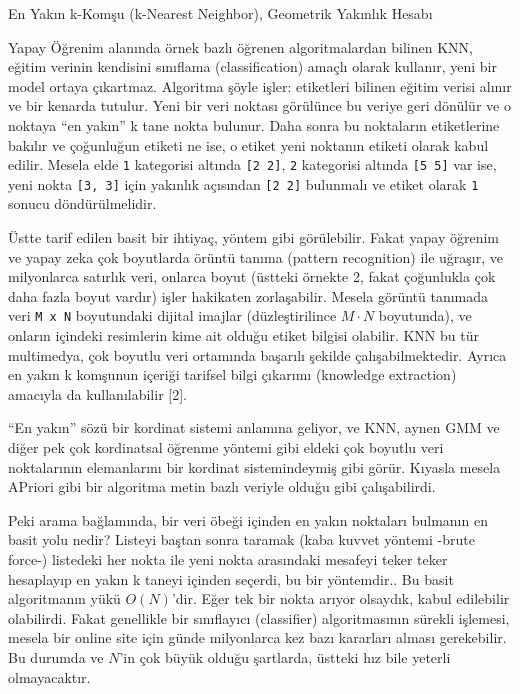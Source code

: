 \documentclass[12pt,fleqn]{article}\usepackage{../../common}
\begin{document}
En Yakın k-Komşu (k-Nearest Neighbor), Geometrik Yakınlık Hesabı

Yapay Öğrenim alanında örnek bazlı öğrenen algoritmalardan bilinen KNN, eğitim
verinin kendisini sınıflama (classification) amaçlı olarak kullanır, yeni bir
model ortaya çıkartmaz. Algoritma şöyle işler: etiketleri bilinen eğitim verisi
alınır ve bir kenarda tutulur. Yeni bir veri noktası görülünce bu veriye geri
dönülür ve o noktaya ``en yakın'' k tane nokta bulunur. Daha sonra bu noktaların
etiketlerine bakılır ve çoğunluğun etiketi ne ise, o etiket yeni noktanın
etiketi olarak kabul edilir. Mesela elde \verb!1! kategorisi altında
\verb![2 2]!, \verb!2! kategorisi altında \verb![5 5]!  var ise, yeni nokta
\verb![3, 3]! için yakınlık açısından \verb![2 2]! bulunmalı ve etiket olarak
\verb!1!  sonucu döndürülmelidir.

Üstte tarif edilen basit bir ihtiyaç, yöntem gibi görülebilir. Fakat yapay
öğrenim ve yapay zeka çok boyutlarda örüntü tanıma (pattern recognition)
ile uğraşır, ve milyonlarca satırlık veri, onlarca boyut (üstteki örnekte
2, fakat çoğunlukla çok daha fazla boyut vardır) işler hakikaten
zorlaşabilir. Mesela görüntü tanımada veri \verb!M x N! boyutundaki dijital
imajlar (düzleştirilince $M \cdot N$ boyutunda), ve onların içindeki
resimlerin kime ait olduğu etiket bilgisi olabilir. KNN bu tür multimedya,
çok boyutlu veri ortamında başarılı şekilde çalışabilmektedir. Ayrıca en
yakın k komşunun içeriği tarifsel bilgi çıkarımı (knowledge extraction)
amacıyla da kullanılabilir [2].

``En yakın'' sözü bir kordinat sistemi anlamına geliyor, ve KNN, aynen GMM
ve diğer pek çok kordinatsal öğrenme yöntemi gibi eldeki çok boyutlu veri
noktalarının elemanlarını bir kordinat sistemindeymiş gibi görür. Kıyasla
mesela APriori gibi bir algoritma metin bazlı veriyle olduğu gibi
çalışabilirdi.

Peki arama bağlamında, bir veri öbeği içinden en yakın noktaları bulmanın
en basit yolu nedir? Listeyi baştan sonra taramak (kaba kuvvet yöntemi
-brute force-) listedeki her nokta ile yeni nokta arasındaki mesafeyi teker
teker hesaplayıp en yakın k taneyi içinden seçerdi, bu bir yöntemdir.. Bu
basit algoritmanın yükü $O(N)$'dir. Eğer tek bir nokta arıyor olsaydık,
kabul edilebilir olabilirdi. Fakat genellikle bir sınıflayıcı (classifier)
algoritmasının sürekli işlemesi, mesela bir online site için günde
milyonlarca kez bazı kararları alması gerekebilir. Bu durumda ve $N$'in çok
büyük olduğu şartlarda, üstteki hız bile yeterli olmayacaktır.
\end{document}
